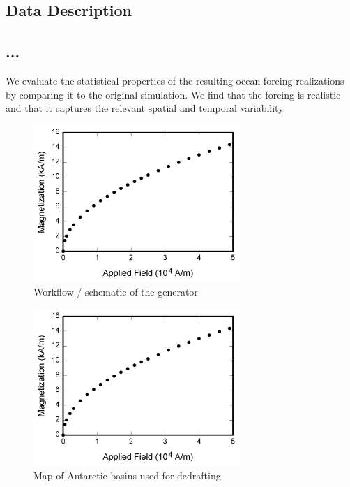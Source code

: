 \subsection{Data Description}

\subsection{...}
We evaluate the statistical properties of the resulting ocean forcing realizations by comparing it to the original simulation. We find that the forcing is realistic and that it captures the relevant spatial and temporal variability.

\begin{figure}
\centerline{\includegraphics[width=18.5pc]{fig/fig1.png}}
\caption{Workflow / schematic of the generator}
\end{figure}

\begin{figure}
\centerline{\includegraphics[width=18.5pc]{fig/fig1.png}}
\caption{Map of Antarctic basins used for dedrafting}
\end{figure}

